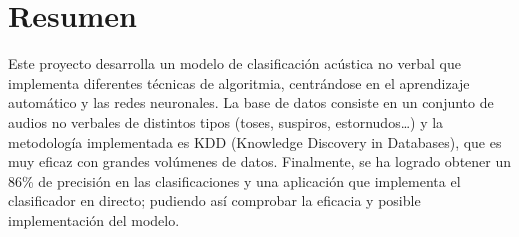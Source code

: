 
\section{Resumen}
Este proyecto desarrolla un modelo de clasificación acústica no verbal que implementa diferentes técnicas de algoritmia, centrándose en el aprendizaje automático y las redes neuronales.
La base de datos consiste en un conjunto de audios no verbales de distintos tipos (toses, suspiros, estornudos…) y la metodología implementada es KDD (Knowledge Discovery in Databases), que es muy eficaz con grandes volúmenes de datos.
Finalmente, se ha logrado obtener un 86\% de precisión en las clasificaciones y una aplicación que implementa el clasificador en directo; pudiendo así comprobar la  eficacia y posible implementación del modelo.